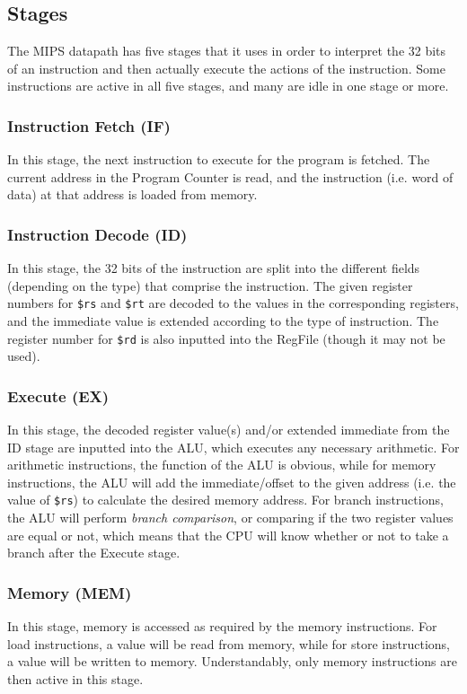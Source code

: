 \documentclass{article}
\begin{document}
\subsection{Stages}
The MIPS datapath has five stages that it uses in order to interpret the 32 bits of an instruction and then actually execute the actions of the instruction. Some instructions are active in all five stages, and many are idle in one stage or more. 

\subsubsection{Instruction Fetch (IF)}
In this stage, the next instruction to execute for the program is fetched. The current address in the Program Counter is read, and the instruction (i.e. word of data) at that address is loaded from memory. 

\subsubsection{Instruction Decode (ID)}
In this stage, the 32 bits of the instruction are split into the different fields (depending on the type) that comprise the instruction. The given register numbers for \texttt{\$rs} and \texttt{\$rt} are decoded to the values in the corresponding registers, and the immediate value is extended according to the type of instruction. The register number for \texttt{\$rd} is also inputted into the RegFile (though it may not be used). 

\subsubsection{Execute (EX)}
In this stage, the decoded register value(s) and/or extended immediate from the ID stage are inputted into the ALU, which executes any necessary arithmetic. For arithmetic instructions, the function of the ALU is obvious, while for memory instructions, the ALU will add the immediate/offset to the given address (i.e. the value of \texttt{\$rs}) to calculate the desired memory address. For branch instructions, the ALU will perform \textit{branch comparison}, or comparing if the two register values are equal or not, which means that the CPU will know whether or not to take a branch after the Execute stage. 

\subsubsection{Memory (MEM)}
In this stage, memory is accessed as required by the memory instructions. For load instructions, a value will be read from memory, while for store instructions, a value will be written to memory. Understandably, only memory instructions are then active in this stage.
\end{document}
